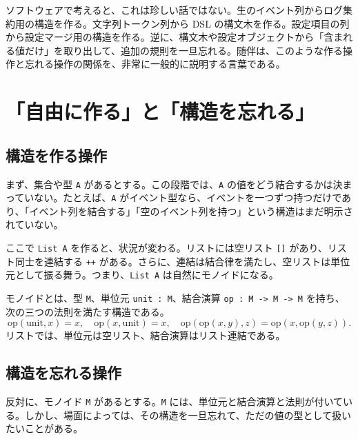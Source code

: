 ソフトウェアで考えると、これは珍しい話ではない。生のイベント列からログ集約用の構造を作る。文字列トークン列から DSL の構文木を作る。設定項目の列から設定マージ用の構造を作る。逆に、構文木や設定オブジェクトから「含まれる値だけ」を取り出して、追加の規則を一旦忘れる。随伴は、このような作る操作と忘れる操作の関係を、非常に一般的に説明する言葉である。


\section{「自由に作る」と「構造を忘れる」}
\label{sec:ch31-free-forgetful}

\subsection{構造を作る操作}

まず、集合や型 \texttt{A} があるとする。この段階では、\texttt{A} の値をどう結合するかは決まっていない。たとえば、\texttt{A} がイベント型なら、イベントを一つずつ持つだけであり、「イベント列を結合する」「空のイベント列を持つ」という構造はまだ明示されていない。

ここで \texttt{List A} を作ると、状況が変わる。リストには空リスト \texttt{[]} があり、リスト同士を連結する \texttt{++} がある。さらに、連結は結合律を満たし、空リストは単位元として振る舞う。つまり、\texttt{List A} は自然にモノイドになる。

\begin{definitionbox}
モノイドとは、型 \texttt{M}、単位元 \texttt{unit : M}、結合演算 \texttt{op : M -> M -> M} を持ち、次の三つの法則を満たす構造である。
\[
  \mathrm{op}(\mathrm{unit}, x) = x,
  \quad
  \mathrm{op}(x, \mathrm{unit}) = x,
  \quad
  \mathrm{op}(\mathrm{op}(x,y),z) = \mathrm{op}(x,\mathrm{op}(y,z)).
\]
リストでは、単位元は空リスト、結合演算はリスト連結である。
\end{definitionbox}

\subsection{構造を忘れる操作}

反対に、モノイド \texttt{M} があるとする。\texttt{M} には、単位元と結合演算と法則が付いている。しかし、場面によっては、その構造を一旦忘れて、ただの値の型として扱いたいことがある。

